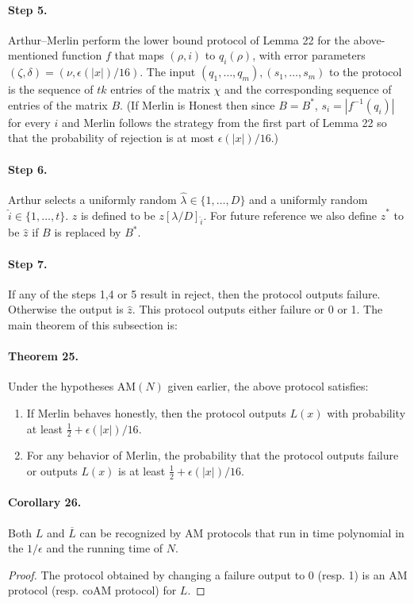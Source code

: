 \paragraph{Step 5.} Arthur--Merlin perform the lower bound protocol of Lemma 22 for the above-mentioned function $f$ that maps $(\rho,i)$ to $q_i(\rho)$, with error parameters $(\zeta,\delta)=(\nu,\epsilon(|x|)/16)$. The input $(q_1,\ldots,q_m),(s_1,\ldots,s_m)$ to the protocol is the sequence of $tk$ entries of the matrix $\chi$ and the corresponding sequence of entries of the matrix $B$. (If Merlin is Honest then since $B=B^*$, $s_i=|f^{-1}(q_i)|$ for every $i$ and Merlin follows the strategy from the first part of Lemma 22 so that the probability of rejection is at most $\epsilon(|x|)/16$.)
\paragraph{Step 6.} Arthur selects a uniformly random $\hat\lambda\in\{1,\ldots,D\}$ and a uniformly random $\hat i\in\{1,\ldots,t\}$. $\hat z$ is defined to be $z[\lambda/D]_{\hat i}$. For future reference we also define $\hat z^*$ to be $\hat z$ if $B$ is replaced by $B^*$.
\paragraph{Step 7.} If any of the steps 1,4 or 5 result in reject, then the protocol outputs failure. Otherwise the output is $\hat z$.
This protocol outputs either failure or 0 or 1. The main theorem of this subsection is:
\paragraph{Theorem 25.} Under the hypotheses AM$(N)$ given earlier, the above protocol satisfies:
\begin{enumerate}\item If Merlin behaves honestly, then the protocol outputs $L(x)$ with probability at least $\frac12+\epsilon(|x|)/16$.
\item For any behavior of Merlin, the probability that the protocol outputs failure or outputs $L(x)$ is at least $\frac12+\epsilon(|x|)/16$.\end{enumerate}
\paragraph{Corollary 26.} Both $L$ and $\overline L$ can be recognized by AM protocols that run in time polynomial in the $1/\epsilon$ and the running time of $N$.
\begin{proof}The protocol obtained by changing a failure output to 0 (resp. 1) is an AM protocol (resp. coAM protocol) for $L$.\end{proof}
